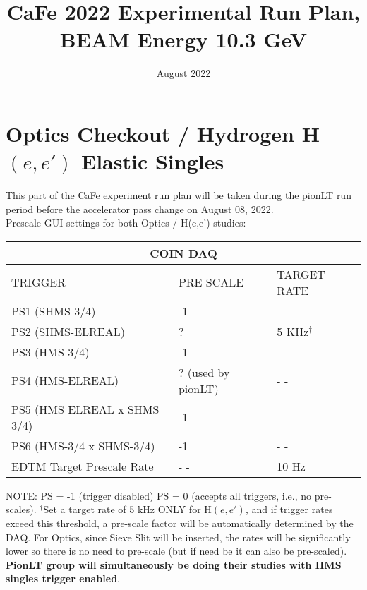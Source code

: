 \documentclass{article}
\title{CaFe 2022 Experimental Run Plan, BEAM Energy 10.3 GeV}
\date{August 2022}
\begin{document}
\maketitle

\section{Optics Checkout / Hydrogen H$(e,e')$ Elastic Singles}
This part of the CaFe experiment run plan will be taken during the pionLT run period
before the accelerator pass change on August 08, 2022.\\

Prescale GUI settings for both Optics / H(e,e') studies:
    
    \begin{center}
    \begin{tabular}{ |p{6cm}| |p{3cm}| |p{3cm}| }
    \hline
    \multicolumn{3}{|c|}{COIN DAQ} \\
    \hline
    TRIGGER & PRE-SCALE & TARGET RATE\\
    \hline
    PS1 (SHMS-3/4)    & -1  & - - \\
    PS2 (SHMS-ELREAL) &  ?  & 5 KHz$^{\dagger}$ \\
    PS3 (HMS-3/4)     & -1  & - -\\
    PS4 (HMS-ELREAL)  & ? (used by pionLT)  & - - \\
    PS5 (HMS-ELREAL x SHMS-3/4)  & -1 & - -  \\
    PS6 (HMS-3/4 x SHMS-3/4)     & -1 & - -  \\
    \hline
    EDTM Target Prescale Rate & - - & 10 Hz \\
    \hline
    \end{tabular}
    \end{center}
    NOTE: PS = -1 (trigger disabled) PS = 0 (accepts all triggers, i.e., no pre-scales). $^{\dagger}$Set a target rate of 5 kHz ONLY for H$(e,e')$,  and if trigger rates exceed this threshold, 
    a pre-scale factor will be automatically determined by the DAQ. For Optics, since
    Sieve Slit will be inserted, the rates will be significantly lower so there is no need to pre-scale (but if need be
    it can also be pre-scaled). \textbf{PionLT group will simultaneously be doing their studies with HMS singles trigger enabled}.
    
\end{document}
